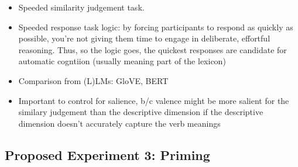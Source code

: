 \documentclass[12pt,letterpaper,table,svgnames,dvipsnames]{article}
\begin{document}
\begin{itemize}
    \item Speeded similarity judgement task.

    \item Speeded response task logic: by forcing participants to respond as quickly as possible, you're not giving them time to engage in deliberate, effortful reasoning. Thus, so the logic goes, the quickest responses are candidate for automatic cogntiion (usually meaning part of the lexicon)

    \item Comparison from (L)LMs: GloVE, BERT

    \item Important to control for salience, b/c valence might be more salient for the similary judgement than the descriptive dimension if the descriptive dimension doesn't accurately capture the verb meanings
    
    




\end{itemize}


\subsection{Proposed Experiment 3: Priming}
\end{document}
